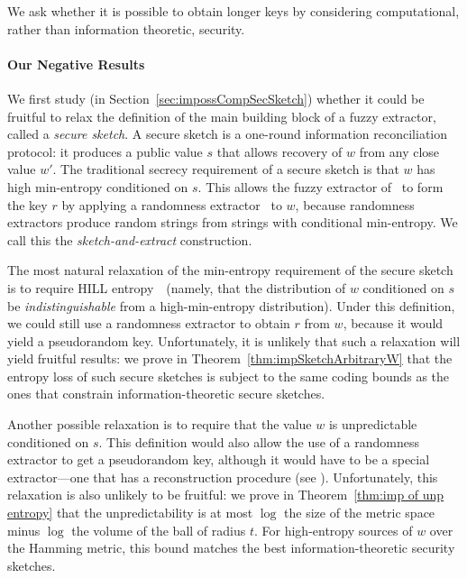 \documentclass[11pt]{article}
\newcommand{\secref}[1]{\mbox{Section~\ref{#1}}}
\newcommand{\thref}[1]{\mbox{Theorem~\ref{#1}}}
\begin{document}
We ask whether it is possible to obtain longer keys by considering
computational, rather than information theoretic, security.

\paragraph {Our Negative Results}
We first study (in  \secref{sec:impossCompSecSketch}) whether it could be fruitful to relax the definition of the main building block of a fuzzy extractor, called a \emph{secure sketch}.  A secure sketch is a one-round information reconciliation protocol: it  produces a public value $s$ that allows recovery of $w$ from any close value $w'$.  The traditional secrecy requirement of a secure sketch is that $w$ has high min-entropy conditioned on $s$.  This allows the fuzzy extractor of~\cite{DBLP:journals/siamcomp/DodisORS08}  to form the key $r$ by applying a randomness extractor~\cite{nisan1993randomness} to $w$, because randomness extractors produce random strings from strings with conditional min-entropy. We call this the \emph{sketch-and-extract} construction.

The most natural relaxation of the min-entropy requirement of the secure sketch is to require HILL entropy~\cite{DBLP:journals/siamcomp/HastadILL99}~(namely, that the distribution of $w$ conditioned on $s$ be \emph{indistinguishable} from a high-min-entropy distribution).  Under this definition, we could still use a randomness extractor to obtain $r$ from $w$, because it would yield a pseudorandom key.  Unfortunately, it is unlikely that such a relaxation will yield fruitful results: we prove in Theorem~\ref{thm:impSketchArbitraryW} that the entropy loss of such secure sketches is subject to the same coding bounds as the ones that constrain information-theoretic secure sketches.  

Another possible relaxation is to require that the value $w$ is unpredictable conditioned on $s$. This definition would also allow the use of a randomness extractor to get a pseudorandom key, although it would have to be a special extractor---one that has  a reconstruction procedure (see \cite[Lemma 6]{DBLP:conf/eurocrypt/HsiaoLR07}).  Unfortunately, this relaxation is also unlikely to be fruitful:  we prove in \thref{thm:imp of unp entropy} that the unpredictability is at most $\log$ the size of the metric space minus $\log$ the volume of the ball of radius $t$.  For high-entropy sources of $w$ over the Hamming metric, this bound matches the best information-theoretic security sketches.
\end{document}
